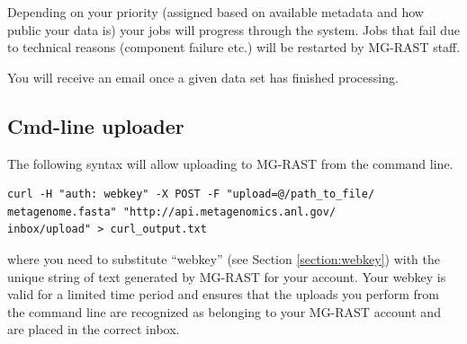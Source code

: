 \documentclass[12pt,fullpage]{report}
\begin{document}
Depending on your priority (assigned based on available metadata and how public your data is) your jobs will progress through the system. Jobs that fail due to technical reasons (component failure etc.) will be restarted by MG-RAST staff.

You will receive an email once a given data set has finished processing.


\subsection{Cmd-line uploader}

The following syntax will allow uploading to MG-RAST from the command line.

\begin{verbatim}
curl -H "auth: webkey" -X POST -F "upload=@/path_to_file/
metagenome.fasta" "http://api.metagenomics.anl.gov/
inbox/upload" > curl_output.txt
\end{verbatim}
where you need to substitute ``webkey'' (see Section \ref{section:webkey}) with the unique string of text generated by MG-RAST for your account. Your webkey is valid for a limited time period and ensures that the uploads you perform from the command line are recognized as belonging to your MG-RAST account and are placed in the correct inbox.



\end{document}
